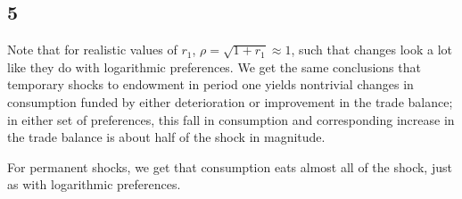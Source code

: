 \documentclass[12pt,letterpaper]{article}
\theoremstyle{definition}
\begin{document}
\subsection*{5}

Note that for realistic values of $r_1$, $\rho = \sqrt{1 + r_1} \approx 1$, such that
changes look a lot like they do with logarithmic preferences. We get the same
conclusions that temporary shocks to endowment in period one yields nontrivial changes in
consumption funded by either deterioration or improvement in the trade
balance; in either set of preferences, this fall in consumption and
corresponding increase in the trade balance is about half of the shock in
magnitude.

For permanent shocks, we get that consumption eats almost all of the shock, just
as with logarithmic preferences.
\end{document}
